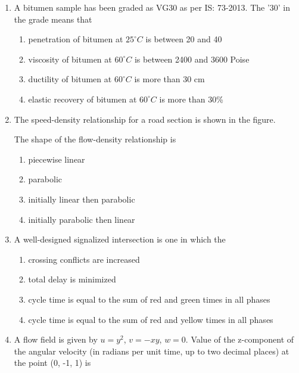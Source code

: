 \documentclass[journal,12pt,onecolumn]{IEEEtran}
\theoremstyle{remark}
\begin{document}
\begin{enumerate}
  
\item A bitumen sample has been graded as VG30 as per IS: 73-2013. The '30' in the grade means that
    \begin{enumerate}
        \item penetration of bitumen at $25^{\circ}C$ is between 20 and 40
        \item viscosity of bitumen at $60^{\circ}C$ is between 2400 and 3600 Poise
        \item ductility of bitumen at $60^{\circ}C$ is more than 30 cm
        \item elastic recovery of bitumen at $60^{\circ}C$ is more than 30\%
    \end{enumerate}

\item The speed-density relationship for a road section is shown in the figure.\\

  \begin{figure}[H]
        \centering
    \end{figure}
       
The shape of the flow-density relationship is
    \begin{enumerate}
        \item piecewise linear
        \item parabolic
        \item initially linear then parabolic
        \item initially parabolic then linear
    \end{enumerate}

\item A well-designed signalized intersection is one in which the
    \begin{enumerate}
        \item crossing conflicts are increased
        \item total delay is minimized
        \item cycle time is equal to the sum of red and green times in all phases
        \item cycle time is equal to the sum of red and yellow times in all phases
    \end{enumerate}

\item A flow field is given by $u = y^2$, $v = -xy$, $w = 0$. Value of the z-component of the angular velocity (in radians per unit time, up to two decimal places) at the point (0, -1, 1) is \underline{\hspace{1cm}}



\end{enumerate}
\end{document}
